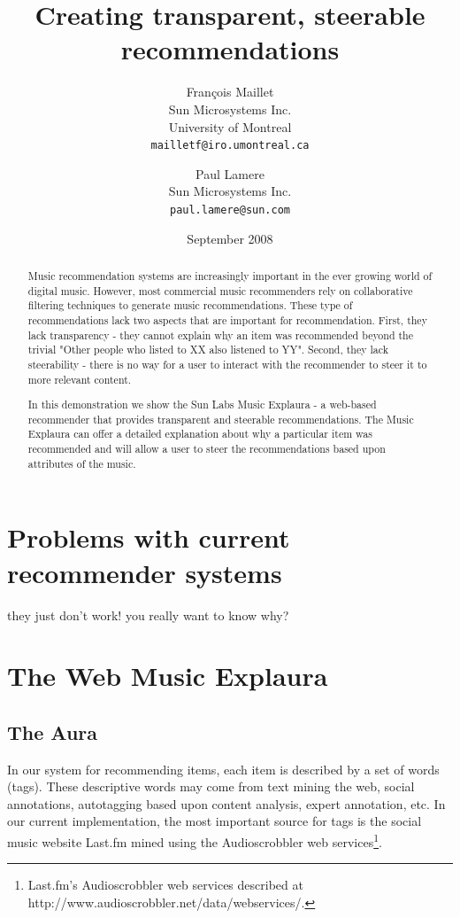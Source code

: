 \documentclass[a4paper,10pt,twocolumn]{article}
\title{Creating transparent, steerable recommendations}
\author{
Fran\c{c}ois Maillet\\
Sun Microsystems Inc.\\
University of Montreal\\
\texttt{mailletf@iro.umontreal.ca}
\and 
Paul Lamere \\
Sun Microsystems Inc.\\
\texttt{paul.lamere@sun.com}
}
\date{September 2008}
\begin{document}
\maketitle

\begin{abstract}

Music recommendation systems are increasingly important in the ever 
    growing world of digital music.  However, most commercial music 
    recommenders rely on collaborative filtering techniques to generate 
    music recommendations. These type of recommendations lack two aspects 
    that are important for recommendation.  First, they lack transparency 
    - they cannot explain why an item was recommended beyond the trivial 
    "Other people who listed to XX also listened to YY". Second, they 
    lack steerability - there is no way for a user to interact with the 
    recommender to steer it to more relevant content.
    
    In this demonstration we show the Sun Labs Music Explaura - a 
    web-based recommender that provides transparent and steerable 
    recommendations. The Music Explaura can offer a detailed explanation 
    about why a particular item was recommended and will allow a user to 
    steer the recommendations based upon attributes of the music.

\end{abstract}

\section{Problems with current recommender systems}

they just don't work! you really want to know why?

\section{The Web Music Explaura}

\subsection{The Aura}

In our system for recommending items, each item is
described by a set of words (tags).  These
descriptive words may come from text mining the
web, social annotations, autotagging based upon
content analysis, expert annotation, etc. In our current 
implementation, the most important source for tags 
is the social music website Last.fm mined using the
Audioscrobbler web services\footnote{Last.fm's Audioscrobbler web services described at http://www.audioscrobbler.net/data/webservices/.}.
\end{document}
